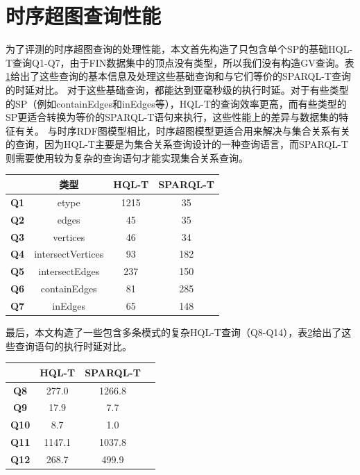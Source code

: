 \section{时序超图查询性能}
为了评测\sys 的时序超图查询的处理性能，本文首先构造了只包含单个SP的基础HQL-T查询Q1-Q7，由于FIN数据集中的顶点没有类型，所以我们没有构造GV查询。表\ref{tab:single}给出了这些查询的基本信息及\sys 处理这些基础查询和与它们等价的SPARQL-T查询的时延对比。
对于这些基础查询，\sys 都能达到亚毫秒级的执行时延。对于有些类型的SP（例如containEdges和inEdges等），HQL-T的查询效率更高，而有些类型的SP更适合转换为等价的SPARQL-T语句来执行，这些性能上的差异与数据集的特征有关。
与时序RDF图模型相比，时序超图模型更适合用来解决与集合关系有关的查询，因为HQL-T主要是为集合关系查询设计的一种查询语言，而SPARQL-T则需要使用较为复杂的查询语句才能实现集合关系查询。

\begin{table}[!hpt]
  \label{tab:single}
  \centering
  \begin{tabular}{cccc} \toprule
    & 类型 & HQL-T & SPARQL-T \\ \midrule
    \textbf{Q1} & etype & 1215 & 35 \\
    \textbf{Q2} & edges & 45 & 35 \\
    \textbf{Q3} & vertices & 46 & 34 \\
    \textbf{Q4} & intersectVertices & 93 & 182 \\
    \textbf{Q5} & intersectEdges & 237 & 150 \\
    \textbf{Q6} & containEdges & 81 & 285 \\
    \textbf{Q7} & inEdges & 65 & 148 \\
    \bottomrule
  \end{tabular}
\end{table}

最后，本文构造了一些包含多条模式的复杂HQL-T查询（Q8-Q14），表\ref{tab:multi}给出了这些查询语句的执行时延对比。

\begin{table}[!hpt]
  \label{tab:multi}
  \centering
  \begin{tabular}{cccc} \toprule
    & HQL-T & SPARQL-T \\ \midrule
    \textbf{Q8} & 277.0 & 1266.8 \\
    \textbf{Q9} & 17.9 & 7.7 \\
    \textbf{Q10} & 8.7 & 1.0 \\
    \textbf{Q11} & 1147.1 & 1037.8 \\
    \textbf{Q12} & 268.7 & 499.9 \\
    \bottomrule
  \end{tabular}
\end{table}

